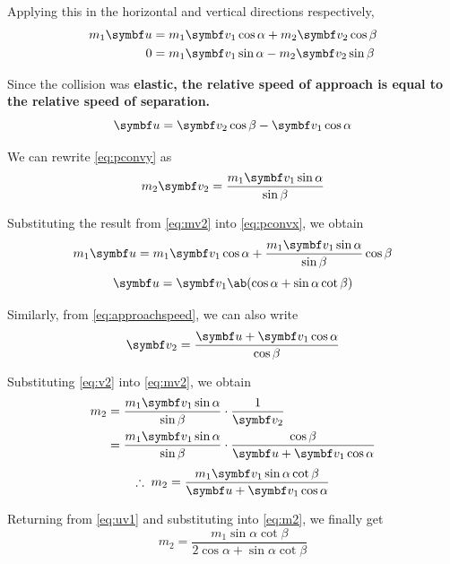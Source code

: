 Applying this in the horizontal and vertical directions respectively,
\begin{align}
  \label{eq:pconvx}
  m_1\mv{u} &= m_1\mv{v}_1 \cos\alpha + m_2\mv{v}_2 \cos \beta \\
  0 &= m_1\mv{v}_1 \sin \alpha - m_2\mv{v}_2 \sin \beta
  \label{eq:pconvy}
\end{align}

Since the collision was \bf{elastic}, the relative speed of approach
is equal to the relative speed of separation.
\begin{equation}
  \mv{u} = \mv{v}_2 \cos \beta - \mv{v}_1 \cos \alpha
  \label{eq:approachspeed}
\end{equation}

We can rewrite \cref{eq:pconvy} as
\begin{equation}
  m_2\mv{v}_2 = \dfrac{m_1\mv{v}_1\sin\alpha}{\sin\beta}
  \label{eq:mv2}
\end{equation}

Substituting the result from \cref{eq:mv2} into \cref{eq:pconvx}, we obtain
\begin{align*}
  m_1\mv{u} &= m_1\mv{v}_1\cos\alpha +
  \dfrac{m_1\mv{v_1}\sin\alpha}{\sin\beta}\cos\beta \\
\end{align*}
\begin{equation}
  \mv{u} = \mv{v}_1\ab(\cos\alpha + \sin\alpha\cot\beta)
  \label{eq:uv1}
\end{equation}

Similarly, from \cref{eq:approachspeed}, we can also write
\begin{equation}
  \mv{v}_2 = \dfrac{\mv{u} + \mv{v}_1\cos\alpha}{\cos\beta}
  \label{eq:v2}
\end{equation}

Substituting \cref{eq:v2} into \cref{eq:mv2}, we obtain
\begin{align*}
  m_2 &= \dfrac{m_1\mv{v}_1\sin\alpha}{\sin\beta} \cdot \dfrac{1}{\mv{v}_2} \\
  &=
  \dfrac{m_1\mv{v}_1\sin\alpha}{\sin\beta}\cdot\dfrac{\cos\beta}{\mv{u}
  + \mv{v}_1\cos\alpha} \\
\end{align*}
\begin{equation}
  \therefore\; m_2
  =\dfrac{m_1\mv{v}_1\sin\alpha\cot\beta}{\mv{u}+\mv{v}_1\cos\alpha}
  \label{eq:m2}
\end{equation}

Returning from \cref{eq:uv1} and substituting into \cref{eq:m2}, we finally get
\begin{equation}
  m_2 = \dfrac{m_1\sin\alpha\cot\beta}{2\cos\alpha + \sin\alpha\cot\beta}
\end{equation}

